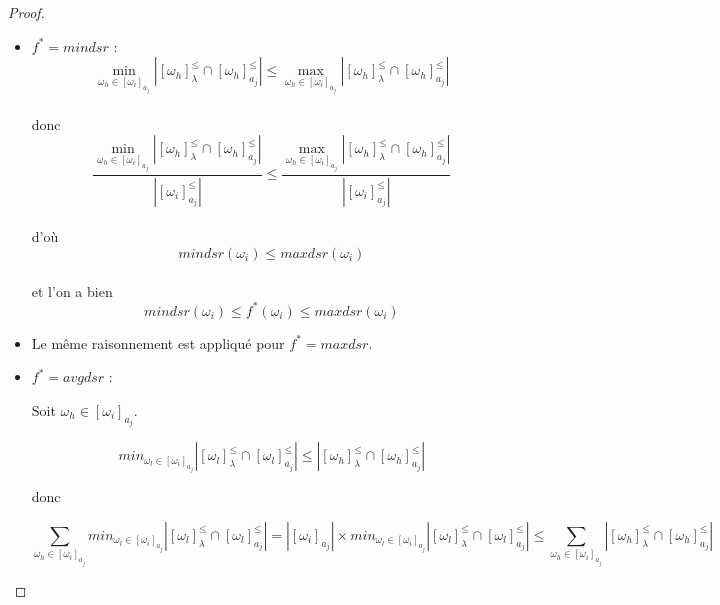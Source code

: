 \documentclass[a4paper]{article}
\begin{document}
\begin{proof}
\begin{itemize}
\item $f^* = mindsr$ : \\
 
    $$\min_{\omega_h \in [\omega_i]_{a_j}} |[\omega_h]^{\leq}_{\lambda} \cap
        [\omega_h]^{\leq}_{a_j}| \leq \max_{\omega_h \in [\omega_i]_{a_j}}
        |[\omega_h]^{\leq}_{\lambda} \cap [\omega_h]^{\leq}_{a_j}|$$ \\
    donc 
     $$\frac{\min_{\omega_h \in [\omega_i]_{a_j}} |[\omega_h]^{\leq}_{\lambda} \cap
        [\omega_h]^{\leq}_{a_j}|}{|[\omega_i]^{\leq}_{a_j}|} \leq
        \frac{\max_{\omega_h \in [\omega_i]_{a_j}}
        |[\omega_h]^{\leq}_{\lambda} \cap
        [\omega_h]^{\leq}_{a_j}|}{|[\omega_i]^{\leq}_{a_j}|}$$ \\
    d'où
        $$mindsr(\omega_i) \leq maxdsr(\omega_i)$$ \\
    et l'on a bien \\
    $$mindsr(\omega_i) \leq f^*(\omega_i) \leq maxdsr(\omega_i)$$

\item Le même raisonnement est appliqué pour $f^* = maxdsr$.

\item $f^* = avgdsr$ :

    Soit $\omega_h \in [\omega_i]_{a_j}$. 
    
    $$min_{\omega_l \in [\omega_i]_{a_j}} |[\omega_l]^{\leq}_{\lambda} \cap
    [\omega_l]^{\leq}_{a_j}| \leq |[\omega_h]^{\leq}_{\lambda} \cap
    [\omega_h]^{\leq}_{a_j}|$$

    donc

    $$\sum_{\omega_h \in [\omega_i]_{a_j}} min_{\omega_l \in [\omega_i]_{a_j}}
    |[\omega_l]^{\leq}_{\lambda} \cap [\omega_l]^{\leq}_{a_j}| =
    |[\omega_i]_{a_j}| \times min_{\omega_l \in [\omega_i]_{a_j}}
    |[\omega_l]^{\leq}_{\lambda} \cap [\omega_l]^{\leq}_{a_j}| \leq
    \sum_{\omega_h \in [\omega_i]_{a_j}} |[\omega_h]^{\leq}_{\lambda} \cap
    [\omega_h]^{\leq}_{a_j}|$$


\end{itemize}
\end{proof}
\end{document}
